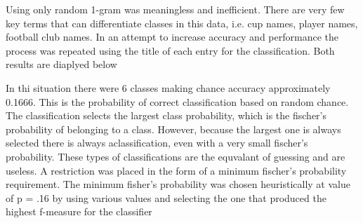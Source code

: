 Using only random 1-gram was meaningless and inefficient. There are very few key terms that can differentiate classes in this data, i.e. cup names, player names, football club names. In an attempt to increase accuracy and performance the process was repeated using the title of each entry for the classification. Both results are diaplyed below

In thi situation there were 6 classes making chance accuracy approximately 0.1666. This is the probability of correct classification based on random chance. The classification selects the largest class probability, which is the fischer's probability of belonging to a class. However, because the largest one is always selected there is always aclassification, even with a very small fischer's probability. These types of classifications are the equvalant of guessing and are useless. A restriction was placed in the form of a minimum fischer's probability requirement. The minimum fisher's probability was chosen heuristically at value of p = .16 by using various values and selecting the one that produced the highest f-measure for the classifier


